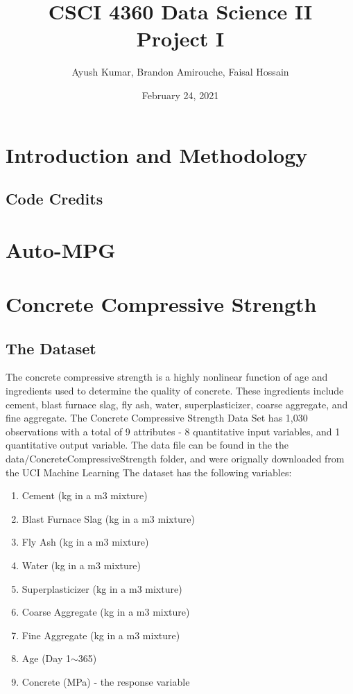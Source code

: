 \documentclass{article}
\title{CSCI 4360 Data Science II \protect\\ Project I}
\author{Ayush Kumar, Brandon Amirouche, Faisal Hossain}
\date{February 24, 2021}
\begin{document}
 
	
	\maketitle
	\tableofcontents
	\newpage


	\section{Introduction and Methodology}


	\subsection{Code Credits}


	\section{Auto-MPG}


	\section{Concrete Compressive Strength} 

	\subsection{The Dataset}

	The concrete compressive strength is a highly nonlinear function of age and ingredients used to determine the quality 
	of concrete. These ingredients include cement, blast furnace slag, fly ash, water, superplasticizer, coarse aggregate, 
	and fine aggregate. The Concrete Compressive Strength Data Set has 1,030 observations with a total of 9 attributes - 8 
	quantitative input variables, and 1 quantitative output variable. The data file can be found in the the data/ConcreteCompressiveStrength 
	folder, and were orignally downloaded from the UCI Machine Learning The dataset has the following variables: 
	
	\begin{enumerate}
		\item Cement (kg in a m3 mixture)
		\item Blast Furnace Slag (kg in a m3 mixture)
		\item Fly Ash (kg in a m3 mixture)
		\item Water (kg in a m3 mixture)
		\item Superplasticizer (kg in a m3 mixture)
		\item Coarse Aggregate (kg in a m3 mixture)
		\item Fine Aggregate (kg in a m3 mixture)
		\item Age (Day 1$\sim$365)
		\item Concrete (MPa) - the response variable
	\end{enumerate}
	
\end{document}
